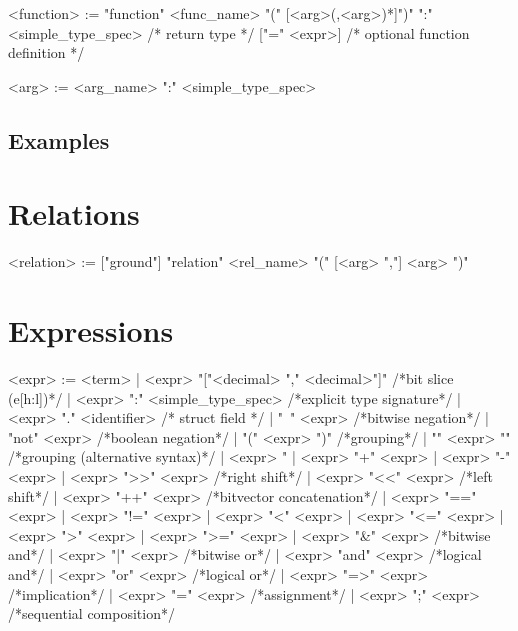 \documentclass{report}
\begin{document}
\begin{bnflisting}{}
<function> := "function" <func_name> "(" [<arg>(,<arg>)*]")"
              ":" <simple_type_spec> /* return type */
              ["=" <expr>]    /* optional function definition */
\end{bnflisting}

\begin{bnflisting}{}
<arg> := <arg_name> ":" <simple_type_spec>
\end{bnflisting}

\subsection*{Examples}


\section{Relations}

\begin{bnflisting}{}
<relation> := ["ground"] "relation" <rel_name> "(" [<arg> ","] <arg> ")"
\end{bnflisting}

\section{Expressions}


\begin{bnflisting}{}
<expr> := <term>
        | <expr> "["<decimal> "," <decimal>"]"  /*bit slice (e[h:l])*/
        | <expr> ":" <simple_type_spec>         /*explicit type signature*/
        | <expr> "." <identifier>               /* struct field */
        | "~" <expr>                            /*bitwise negation*/
        | "not" <expr>                          /*boolean negation*/
        | "(" <expr> ")"                        /*grouping*/
        | "{" <expr> "}"                        /*grouping (alternative syntax)*/
        | <expr> "%
        | <expr> "+" <expr>
        | <expr> "-" <expr>
        | <expr> ">>" <expr>                    /*right shift*/
        | <expr> "<<" <expr>                    /*left shift*/
        | <expr> "++" <expr>                    /*bitvector concatenation*/
        | <expr> "==" <expr>
        | <expr> "!=" <expr>
        | <expr> "<" <expr>
        | <expr> "<=" <expr>
        | <expr> ">" <expr>
        | <expr> ">=" <expr>
        | <expr> "&" <expr>                     /*bitwise and*/
        | <expr> "|" <expr>                     /*bitwise or*/
        | <expr> "and" <expr>                   /*logical and*/
        | <expr> "or" <expr>                    /*logical or*/
        | <expr> "=>" <expr>                    /*implication*/
        | <expr> "=" <expr>                     /*assignment*/
        | <expr> ";" <expr>                     /*sequential composition*/
\end{bnflisting}
\end{document}
